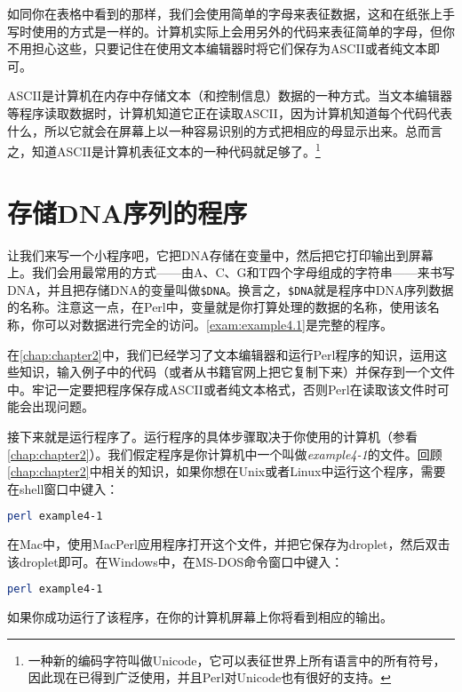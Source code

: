 如同你在表格中看到的那样，我们会使用简单的字母来表征数据，这和在纸张上手写时使用的方式是一样的。计算机实际上会用另外的代码来表征简单的字母，但你不用担心这些，只要记住在使用文本编辑器时将它们保存为ASCII或者纯文本即可。

ASCII是计算机在内存中存储文本（和控制信息）数据的一种方式。当文本编辑器等程序读取数据时，计算机知道它正在读取ASCII，因为计算机知道每个代码代表什么，所以它就会在屏幕上以一种容易识别的方式把相应的母显示出来。总而言之，知道ASCII是计算机表征文本的一种代码就足够了。\footnote{一种新的编码字符叫做Unicode，它可以表征世界上所有语言中的所有符号，因此现在已得到广泛使用，并且Perl对Unicode也有很好的支持。}

\section{存储DNA序列的程序}
让我们来写一个小程序吧，它把DNA存储在变量中，然后把它打印输出到屏幕上。我们会用最常用的方式——由A、C、G和T四个字母组成的字符串——来书写DNA，并且把存储DNA的变量叫做\verb|$DNA|。换言之，\verb|$DNA|就是程序中DNA序列数据的名称。注意这一点，在Perl中，变量就是你打算处理的数据的名称，使用该名称，你可以对数据进行完全的访问。\autoref{exam:example4.1}是完整的程序。



在\autoref{chap:chapter2}中，我们已经学习了文本编辑器和运行Perl程序的知识，运用这些知识，输入例子中的代码（或者从书籍官网上把它复制下来）并保存到一个文件中。牢记一定要把程序保存成ASCII或者纯文本格式，否则Perl在读取该文件时可能会出现问题。

接下来就是运行程序了。运行程序的具体步骤取决于你使用的计算机（参看\autoref{chap:chapter2}）。我们假定程序是你计算机中一个叫做\textit{example4-1}的文件。回顾\autoref{chap:chapter2}中相关的知识，如果你想在Unix或者Linux中运行这个程序，需要在shell窗口中键入：

\begin{lstlisting}[language=bash]
perl example4-1
\end{lstlisting}

在Mac中，使用MacPerl应用程序打开这个文件，并把它保存为droplet，然后双击该droplet即可。在Windows中，在MS-DOS命令窗口中键入：

\begin{lstlisting}[language=bash]
perl example4-1
\end{lstlisting}

如果你成功运行了该程序，在你的计算机屏幕上你将看到相应的输出。


